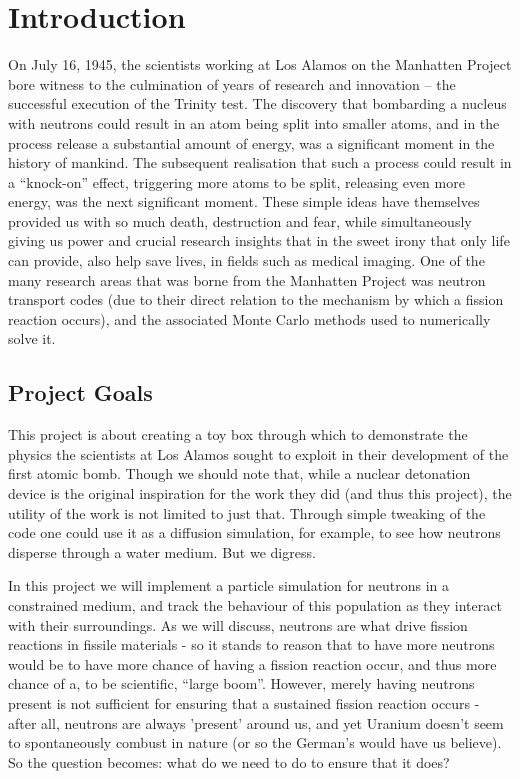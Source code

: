 

\section{Introduction}

On July 16, 1945, the scientists working at Los Alamos on the Manhatten Project bore witness to the culmination of years 
of research and innovation -- the successful execution of the Trinity test. The discovery that bombarding a nucleus with neutrons 
could result in an atom being split into smaller atoms, and in the process release a substantial amount of energy, was 
a significant moment in the history of mankind. The subsequent realisation that such a process could result in a ``knock-on'' effect, 
triggering more atoms to be split, releasing even more energy, was the next significant moment. These simple ideas have themselves 
provided us with so much death, destruction and fear, while simultaneously giving us power and crucial research insights that in the 
sweet irony that only life can provide, also help save lives, in fields such as medical imaging. One of the many 
research areas that was borne from the Manhatten Project was neutron transport codes (due to their direct relation 
to the mechanism by which a fission reaction occurs), and the associated Monte Carlo methods used to numerically solve 
it.



\subsection{Project Goals}

This project is about creating a toy box through which to demonstrate the physics the scientists at Los Alamos sought to exploit 
in their development of the first atomic bomb. Though we should note that, while a nuclear detonation device is the original 
inspiration for the work they did (and thus this project), the utility of the work is not limited to just that. Through simple 
tweaking of the code one could use it as a diffusion simulation, for example, to see how neutrons disperse through a water medium. But 
we digress. 

In this project we will implement a particle simulation for neutrons in a constrained medium, and track the behaviour of this population 
as they interact with their surroundings. As we will discuss, neutrons are what drive fission reactions in fissile materials - so it 
stands to reason that to have more neutrons would be to have more chance of having a fission reaction occur, and thus more chance of a, 
to be scientific, ``large boom''. However, merely having neutrons present is not sufficient for ensuring that a sustained fission reaction occurs 
- after all, neutrons are always 'present' around us, and yet Uranium doesn't seem to spontaneously combust in nature (or so the German's would have 
us believe). So the question becomes: what do we need to do to ensure that it does? 

